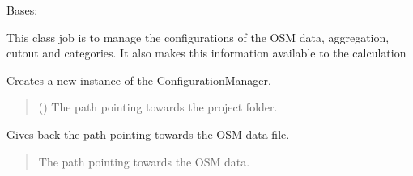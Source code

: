 \documentclass[letterpaper,10pt,english]{sphinxmanual}
\begin{document}
\begin{fulllineitems}
\label{\detokenize{apidoc/src.osm_configurator.model.project.configuration:src.osm_configurator.model.project.configuration.configuration_manager.ConfigurationManager}}
\pysigstartsignatures
{}
\pysigstopsignatures
\sphinxAtStartPar
Bases: 

\sphinxAtStartPar
This class job is to manage the configurations of the OSM data, aggregation, cut\sphinxhyphen{}out and categories.
It also makes this information available to the calculation

\begin{fulllineitems}
\label{\detokenize{apidoc/src.osm_configurator.model.project.configuration:src.osm_configurator.model.project.configuration.configuration_manager.ConfigurationManager.__init__}}
\pysigstartsignatures
{}
\pysigstopsignatures
\sphinxAtStartPar
Creates a new instance of the ConfigurationManager.
\begin{quote}\begin{description}
\sphinxAtStartPar
{} () \textendash{} The path pointing towards the project folder.

\end{description}\end{quote}

\end{fulllineitems}


\begin{fulllineitems}
\label{\detokenize{apidoc/src.osm_configurator.model.project.configuration:src.osm_configurator.model.project.configuration.configuration_manager.ConfigurationManager.get_osm_data}}
\pysigstartsignatures
{}
\pysigstopsignatures
\sphinxAtStartPar
Gives back the path pointing towards the OSM data file.
\begin{quote}\begin{description}
\sphinxAtStartPar
The path pointing towards the OSM data.


\end{description}
\end{quote}
\end{fulllineitems}
\end{fulllineitems}
\end{document}
